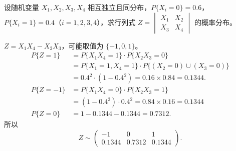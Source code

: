 \documentclass[lang=cn,11pt]{elegantbook}
\begin{document}
\begin{exercise}[行列式分布] \label{exer:3-c6}
设随机变量 $X_1, X_2, X_3, X_4$ 相互独立且同分布，$P\{X_i=0\} = 0.6$，$P\{X_i=1\} = 0.4$（$i=1,2,3,4$），求行列式 $Z = \begin{vmatrix} X_1 & X_2 \\ X_3 & X_4 \end{vmatrix}$ 的概率分布。
\end{exercise}
\begin{solution}
$Z = X_1X_4 - X_2X_3$，可能取值为 $\{-1, 0, 1\}$。
\begin{align*}
P\{Z=1\} &= P\{X_1X_4=1\}\cdot P\{X_2X_3=0\}\\
& = P\{X_1=1,X_4=1\}\cdot P\{(X_2=0)\cup(X_3=0)\}\\
&= 0.4^2 \cdot (1-0.4^2) = 0.16 \times 0.84 = 0.1344.\\
P\{Z=-1\} &= P\{X_1X_4=0\}\cdot P\{X_2X_3=1\} \\
&= (1-0.4^2)\cdot 0.4^2 = 0.84 \times 0.16 = 0.1344\\
P\{Z=0\} &= 1 - 0.1344 - 0.1344 = 0.7312.
\end{align*}
所以
\[
Z \sim \begin{pmatrix} -1 & 0 & 1 \\ 0.1344 & 0.7312 & 0.1344 \end{pmatrix}.
\]
\end{solution}
\end{document}
